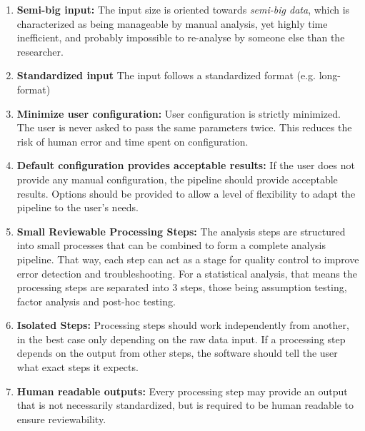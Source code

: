 \begin{enumerate}
    \item \textbf{Semi-big input:} The input size is oriented towards
          \textit{semi-big data}, which is characterized as being manageable by
          manual analysis, yet highly time inefficient, and probably impossible
          to re-analyse by someone else than the researcher.
    \item \textbf{Standardized input} The input follows a standardized format (e.g. long-format)
    \item \textbf{Minimize user configuration:} User configuration is strictly
          minimized. The user is never asked to pass the same parameters twice. This
          reduces the risk of human error and time spent on configuration.
    \item \textbf{Default configuration provides acceptable results:} If the
          user does not provide any manual configuration, the pipeline should
          provide acceptable results. Options should be provided to allow a
          level of flexibility to adapt the pipeline to the user's needs.
    \item \textbf{Small Reviewable Processing Steps:} The analysis steps are
          structured into small processes that can be combined to form a
          complete analysis pipeline. That way, each step can act as a stage for
          quality control to improve error detection and troubleshooting. For a
          statistical analysis, that means the processing steps are separated
          into 3 steps, those being assumption testing, factor analysis and
          post-hoc testing.
    \item \textbf{Isolated Steps:} Processing steps should work independently
          from another, in the best case only depending on the raw data input.
          If a processing step depends on the output from other steps, the
          software should tell the user what exact steps it expects.
    \item \textbf{Human readable outputs:} Every processing step may provide
          an output that is not necessarily standardized, but is required to be
          human readable to ensure reviewability.

\end{enumerate}


